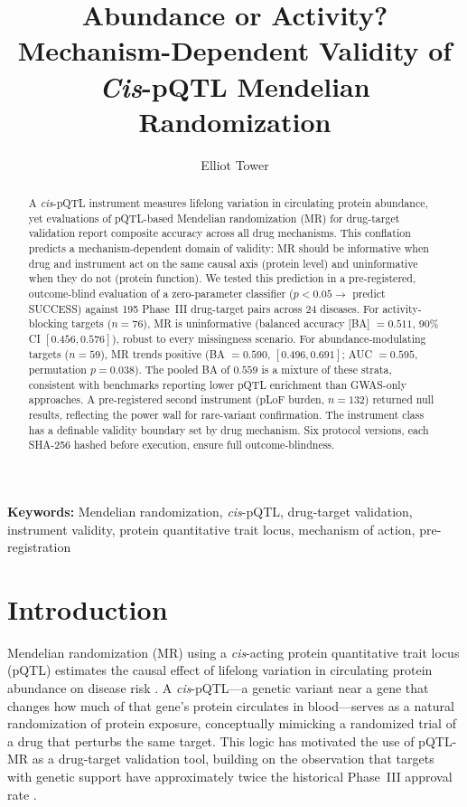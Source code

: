\documentclass[11pt]{article}
\title{Abundance or Activity? Mechanism-Dependent Validity of \emph{Cis}-pQTL Mendelian Randomization}
\author{Elliot Tower}
\affil{Independent researcher \\ \texttt{elliot@elliottower.ai}}
\begin{document}
\linenumbers
\maketitle

\begin{abstract}
A \emph{cis}-pQTL instrument measures lifelong variation in circulating protein abundance, yet evaluations of pQTL-based Mendelian randomization (MR) for drug-target validation report composite accuracy across all drug mechanisms. This conflation predicts a mechanism-dependent domain of validity: MR should be informative when drug and instrument act on the same causal axis (protein level) and uninformative when they do not (protein function). We tested this prediction in a pre-registered, outcome-blind evaluation of a zero-parameter classifier ($p < 0.05 \rightarrow$ predict SUCCESS) against 195 Phase~III drug-target pairs across 24 diseases. For activity-blocking targets ($n = 76$), MR is uninformative (balanced accuracy [BA] $= 0.511$, 90\% CI $[0.456, 0.576]$), robust to every missingness scenario. For abundance-modulating targets ($n = 59$), MR trends positive (BA $= 0.590$, $[0.496, 0.691]$; AUC $= 0.595$, permutation $p = 0.038$). The pooled BA of $0.559$ is a mixture of these strata, consistent with benchmarks reporting lower pQTL enrichment than GWAS-only approaches. A pre-registered second instrument (pLoF burden, $n = 132$) returned null results, reflecting the power wall for rare-variant confirmation. The instrument class has a definable validity boundary set by drug mechanism. Six protocol versions, each SHA-256 hashed before execution, ensure full outcome-blindness.
\end{abstract}

\noindent\textbf{Keywords:} Mendelian randomization, \emph{cis}-pQTL, drug-target validation, instrument validity, protein quantitative trait locus, mechanism of action, pre-registration

\section{Introduction}
\label{sec:intro}

Mendelian randomization (MR) using a \emph{cis}-acting protein quantitative trait locus (pQTL) estimates the causal effect of lifelong variation in circulating protein abundance on disease risk \cite{gill2021mendelian}. A \emph{cis}-pQTL---a genetic variant near a gene that changes how much of that gene's protein circulates in blood---serves as a natural randomization of protein exposure, conceptually mimicking a randomized trial of a drug that perturbs the same target. This logic has motivated the use of pQTL-MR as a drug-target validation tool, building on the observation that targets with genetic support have approximately twice the historical Phase~III approval rate \cite{nelson2015support, king2019greater, minikel2024refining}.
\end{document}
